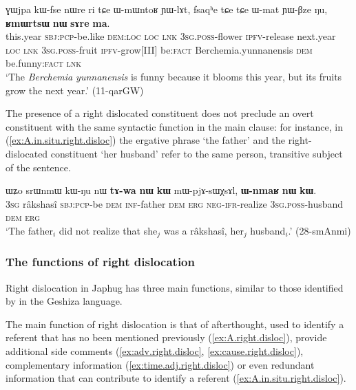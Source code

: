 \begin{exe}
\ex \label{ex:cause.right.disloc}
\gll ɣɯjpa kɯ-fse nɯre ri tɕe ɯ-mɯntoʁ ɲɯ-lɤt, fsaqʰe tɕe tɕe ɯ-mat ɲɯ-βze ŋu, \textbf{ʁmɯrtsɯ} \textbf{nɯ} \textbf{sɤre} \textbf{ma}. \\
this.year \textsc{sbj}:\textsc{pcp}-be.like \textsc{dem}:\textsc{loc} \textsc{loc} \textsc{lnk} \textsc{3sg}.\textsc{poss}-flower \textsc{ipfv}-release next.year \textsc{loc} \textsc{lnk} \textsc{3sg}.\textsc{poss}-fruit \textsc{ipfv}-grow[III] be:\textsc{fact} Berchemia.yunnanensis \textsc{dem} be.funny:\textsc{fact} \textsc{lnk} \\
\glt `The \textit{Berchemia yunnanensis} is funny because it blooms this year, but its fruits grow the next year.' (11-qarGW)
\end{exe}

The presence of a right dislocated constituent does not preclude an overt constituent with the same syntactic function in the main clause: for instance, in (\ref{ex:A.in.situ.right.disloc}) the ergative phrase `the father' and the right-dislocated constituent  `her husband' refer to the same person, transitive subject of the sentence.


\begin{exe}
\ex \label{ex:A.in.situ.right.disloc}
\gll ɯʑo srɯnmɯ kɯ-ŋu nɯ \textbf{tɤ-wa} \textbf{nɯ} \textbf{kɯ} mɯ-pjɤ-sɯχsɤl, \textbf{ɯ-nmaʁ} \textbf{nɯ} \textbf{kɯ}. \\
\textsc{3sg} râkshasî \textsc{sbj}:\textsc{pcp}-be \textsc{dem} \textsc{inf}-father \textsc{dem} \textsc{erg} \textsc{neg}-\textsc{ifr}-realize \textsc{3sg}.\textsc{poss}-husband \textsc{dem} \textsc{erg} \\
\glt `The father$_i$ did not realize that she$_j$ was a râkshasî, her$_j$ husband$_i$.' (28-smAnmi)
\end{exe}

\subsubsection{The functions of right dislocation} \label{sec:right.dislocation.function}
Right dislocation in Japhug has three main functions, similar to those identified by \citet[§13.7.2]{honkasalo19geshiza} in the Geshiza language.

The main function of right dislocation is that of afterthought, used to identify a referent that has no been mentioned previously (\ref{ex:A.right.disloc}), provide additional side comments (\ref{ex:adv.right.disloc}, \ref{ex:cause.right.disloc}), complementary information (\ref{ex:time.adj.right.disloc}) or even redundant information that can contribute to identify a referent (\ref{ex:A.in.situ.right.disloc}).  

